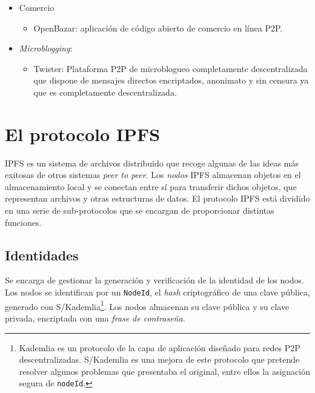 \documentclass[12pt]{article} %
\begin{document}
\begin{itemize}
\begin{itemize}
    \end{itemize}
   \item Comercio
    \begin{itemize}      
      \item  OpenBazar: aplicación de código abierto de comercio en línea P2P.
    \end{itemize}
   	\item \textit{Microblogging}:
   	\begin{itemize}
    	\item Twister: Plataforma P2P de microblogueo completamente descentralizada que dispone de mensajes directos encriptados, anonimato y sin censura ya que es completamente descentralizada.
    \end{itemize} 
\end{itemize}



\section{El protocolo IPFS} %
\label{sec:el_protocolo_ipfs}

IPFS\cite{ipfs-white-paper} es un sistema de archivos distribuido que recoge algunas de las ideas más exitosas de otros sistemas \textit{peer to peer}. Los \textit{nodos} IPFS almacenan objetos en el almacenamiento local y se conectan entre sí para transferir dichos objetos, que representan archivos y otras estructuras de datos. El protocolo IPFS está dividido en una serie de sub-protocolos que se encargan de proporcionar distintas funciones.

\subsection{Identidades} %
\label{sub:identidades}

Se encarga de gestionar la generación y verificación de la identidad de los nodos. Los nodos se identifican por un \texttt{NodeId}, el \textit{hash} criptográfico de una clave pública, generado con S/Kademlia\footnote{Kademlia es un protocolo de la capa de aplicación diseñado para redes P2P descentralizadas. S/Kademlia es una mejora de este protocolo que pretende resolver algunos problemas que presentaba el original, entre ellos la asignación segura de \texttt{nodeId}.\cite{S/Kamdelia}}. Los nodos almacenan su clave pública y su clave privada, encriptada con una \textit{frase de contraseña}.
\end{document}
